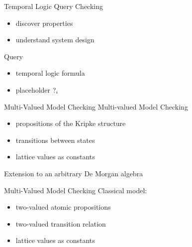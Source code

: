 
\begin{frame}{Temporal Logic Query Checking}
  \begin{itemize}
    \item discover properties
    \item understand system design
  \end{itemize}

  \vfill

  \begin{block}{Query}
    \begin{itemize}
      \item temporal logic formula
      \item placeholder $\operatorname{?}_i$
    \end{itemize}
  \end{block}
\end{frame}


\begin{frame}{Multi-Valued Model Checking}
  Multi-valued Model Checking
  \begin{itemize}
    \item propositions of the Kripke structure
    \item transitions between states
    \item lattice values as constants
  \end{itemize}
  
  Extension to an arbitrary De Morgan algebra
\end{frame}

\begin{frame}{Multi-Valued Model Checking}
  Classical model:
  \begin{itemize}
    \item two-valued atomic propositions
    \item two-valued transition relation
    \item lattice values as constants
  \end{itemize}
\end{frame}
